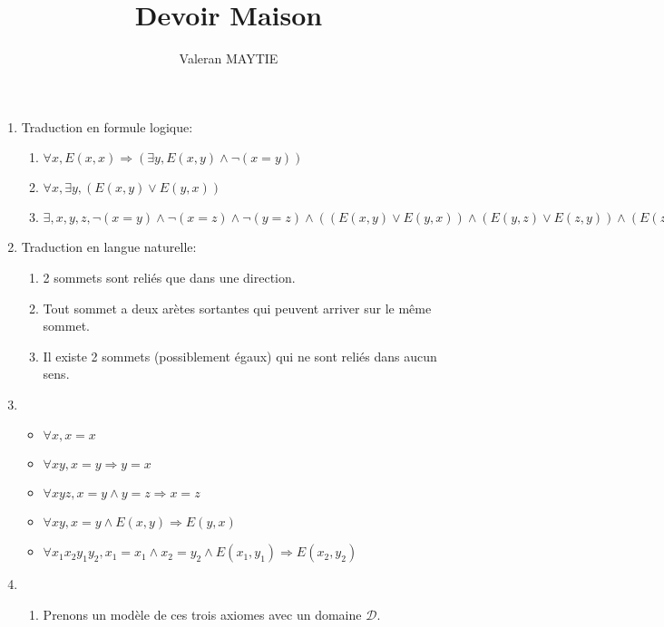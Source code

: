 \documentclass{article}
\title{Devoir Maison}
\author{Valeran MAYTIE}
\date{}
\begin{document}
\maketitle

\begin{enumerate}
    \item Traduction en formule logique:
    \begin{enumerate}
        \item $\forall x, E(x,x) \Rightarrow (\exists y, E(x, y) \wedge \neg(x = y))$
        \item $\forall x, \exists y, (E(x, y) \vee E(y, x))$
        \item $\exists, x, y, z, \neg (x = y) \wedge \neg(x = z) \wedge \neg(y = z)
            \wedge ((E(x, y) \vee E(y, x)) \wedge (E(y, z) \vee E(z, y)) 
            \wedge (E(z, y) \vee E(y, z)))$
    \end{enumerate}

    \item Traduction en langue naturelle:
    \begin{enumerate}
        \item 2 sommets sont reliés que dans une direction.
        \item Tout sommet a deux arètes sortantes qui peuvent arriver sur le même sommet.
        \item Il existe 2 sommets (possiblement égaux) qui ne sont reliés dans aucun sens.
    \end{enumerate}

    \item \begin{itemize}
        \item $\forall x, x = x$
        \item $\forall x y, x = y \Rightarrow y = x$
        \item $\forall x y z, x = y \wedge y = z \Rightarrow   x = z$
        \item $\forall x y, x = y \wedge E(x, y) \Rightarrow E(y, x)$
        \item $\forall x_1 x_2 y_1 y_2, x_1 = x_1 \wedge x_2 = y_2 \wedge E(x_1, y_1) \Rightarrow E(x_2, y_2)$
    \end{itemize}

    \item \begin{enumerate}
        \item Prenons un modèle de ces trois axiomes avec un domaine $\mathcal{D}$.


\end{enumerate}
\end{enumerate}
\end{document}
